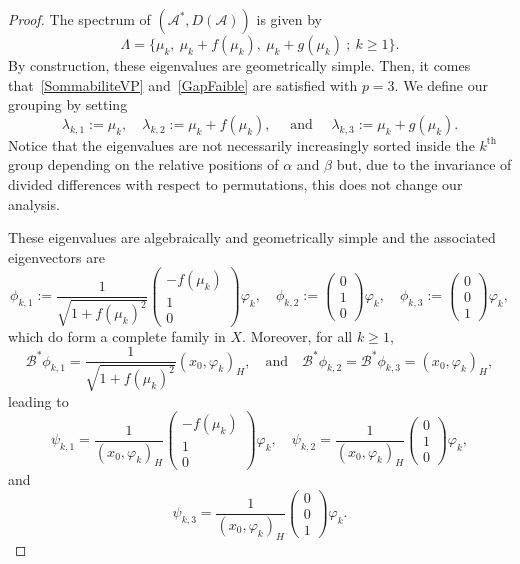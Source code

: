 \documentclass[10pt]{amsart}
\theoremstyle{definition}\newtheorem{defi}[theo]{Definition}\newtheorem{rema}[theo]{Remark}\newtheorem{exam}[theo]{Example}\newtheorem{exem}[theo]{Example}\newtheorem{nota}[theo]{Notation}
\newcommand\A{\mathcal{A}}
\newcommand\As{\mathcal{A}^*}
\newcommand\Bs{\mathcal{B}^*}
\newcommand{\DA}{D(\A)}
\newcommand{\psH}[2]{\left(#1, #2 \right)_H}
\begin{document}
\begin{proof}
The spectrum of $(\As, \DA)$ is given by
\[
\Lambda = \{ \mu_k, \: \mu_k + f(\mu_k), \: \mu_k+g(\mu_k) \: ; \: k \geq 1\}.
\]
By construction, these eigenvalues are geometrically simple. Then, it comes that~\eqref{SommabiliteVP} and~\eqref{GapFaible} are satisfied with $p=3$. We define our grouping by setting
\[
\lambda_{k,1}:=\mu_k, \quad \lambda_{k,2}:=\mu_k+f(\mu_k), \quad \text{ and } \quad \lambda_{k,3} := \mu_k + g(\mu_k).
\]
Notice that the eigenvalues are not necessarily increasingly sorted inside the $k^{\text{th}}$ group depending on the relative positions of $\alpha$ and $\beta$ but, due to the invariance of divided differences with respect to permutations, this does not change our analysis.

These eigenvalues are algebraically and geometrically simple and the associated eigenvectors are
\[
\phi_{k,1} := \frac{1}{\sqrt{1+f(\mu_k)^2}}
\begin{pmatrix} -f(\mu_k) \\1\\0
\end{pmatrix} \varphi_k, \quad
\phi_{k,2} :=
\begin{pmatrix} 0\\1\\0
\end{pmatrix} \varphi_k, \quad
\phi_{k,3} :=
\begin{pmatrix} 0\\0\\1
\end{pmatrix} \varphi_k,
\]
which do form a complete family in $X$. Moreover, for all $k \geq 1$,
\[
\Bs \phi_{k,1}= \frac{1}{\sqrt{1+f(\mu_k)^2}} \psH{x_0}{\varphi_k},
\quad \text{and} \quad
\Bs \phi_{k,2}= \Bs \phi_{k,3} = \psH{x_0}{\varphi_k},
\]
leading to
\[
\psi_{k,1} = \frac{1}{\psH{x_0}{\varphi_k}}
\begin{pmatrix}
-f(\mu_k) \\1\\0
\end{pmatrix} \varphi_k,
\quad
\psi_{k,2} = \frac{1}{\psH{x_0}{\varphi_k}}
\begin{pmatrix}
0\\1\\0
\end{pmatrix} \varphi_k,
\]
and
\[
\psi_{k,3} = \frac{1}{\psH{x_0}{\varphi_k}}
\begin{pmatrix}
0\\0\\1
\end{pmatrix} \varphi_k.
\]
\end{proof}
\end{document}
